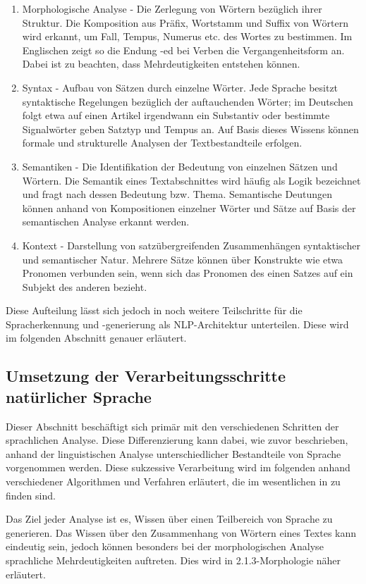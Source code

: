 \documentclass[12pt]{report}
\begin{document}
\begin{enumerate}
\item
Morphologische Analyse - Die Zerlegung von Wörtern bezüglich ihrer Struktur. Die Komposition aus Präfix, Wortstamm und Suffix von Wörtern wird erkannt, um Fall, Tempus, Numerus etc. des Wortes zu bestimmen. Im Englischen zeigt so die Endung -ed bei Verben die Vergangenheitsform an. Dabei ist zu beachten, dass Mehrdeutigkeiten entstehen können.
\item
Syntax - Aufbau von Sätzen durch einzelne Wörter. Jede Sprache besitzt syntaktische Regelungen bezüglich der auftauchenden Wörter; im Deutschen folgt etwa auf einen Artikel irgendwann ein Substantiv oder bestimmte Signalwörter geben Satztyp und Tempus an. Auf Basis dieses Wissens können formale und strukturelle Analysen der Textbestandteile erfolgen.
\item
Semantiken - Die Identifikation der Bedeutung von einzelnen Sätzen und Wörtern. Die Semantik eines Textabschnittes wird häufig als \glqq  Logik\grqq{} bezeichnet und fragt nach dessen Bedeutung bzw. Thema. Semantische Deutungen können anhand von Kompositionen einzelner Wörter und Sätze auf Basis der semantischen Analyse erkannt werden.
\item
Kontext - Darstellung von satzübergreifenden Zusammenhängen syntaktischer und semantischer Natur. Mehrere Sätze können über Konstrukte wie etwa Pronomen verbunden sein, wenn sich das Pronomen des einen Satzes auf ein Subjekt des anderen bezieht. 
\end{enumerate}

Diese Aufteilung lässt sich jedoch in noch weitere Teilschritte für die Spracherkennung und -generierung als NLP-Architektur unterteilen. Diese wird im folgenden Abschnitt genauer erläutert. 

\subsection{Umsetzung der Verarbeitungsschritte natürlicher Sprache}
Dieser Abschnitt beschäftigt sich primär mit den verschiedenen Schritten der sprachlichen Analyse. Diese Differenzierung kann dabei, wie zuvor beschrieben, anhand der linguistischen Analyse unterschiedlicher Bestandteile von Sprache vorgenommen werden. Diese sukzessive Verarbeitung wird im folgenden anhand verschiedener Algorithmen und Verfahren erläutert, die im wesentlichen in \cite{rs18} zu finden sind. 

Das Ziel jeder Analyse ist es, Wissen über einen Teilbereich von Sprache zu generieren. Das Wissen über den Zusammenhang von Wörtern eines Textes kann eindeutig sein, jedoch können besonders bei der morphologischen Analyse sprachliche Mehrdeutigkeiten auftreten. Dies wird in 2.1.3-Morphologie näher erläutert. 
\end{document}
